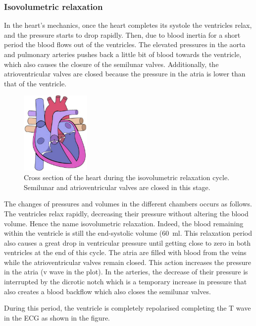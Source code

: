 \subsubsection{Isovolumetric relaxation}
In the heart's mechanics, once the heart completes its systole the ventricles relax, and the pressure starts to drop rapidly. Then, due to blood inertia for a short period the blood flows out of the ventricles. The elevated pressures in the aorta and pulmonary arteries pushes back a little bit of blood towards the ventricle, which also causes the closure of the semilunar valves. Additionally, the atrioventricular valves are closed because the pressure in the atria is lower than that of the ventricle.

\begin{figure}[!htpb]
		\centering
		\includegraphics[height=4cm,keepaspectratio]{figure_9}
		\caption[Heart during isovolumetric relaxation cycle]{Cross section of the heart during the isovolumetric relaxation cycle. Semilunar and atrioventricular valves are closed in this stage.}
		\label{fig:heart isovolumetric relaxation}
\end{figure}

The changes of pressures and volumes in the different chambers occurs as follows. The ventricles relax rapidly, decreasing their pressure without altering the blood volume. Hence the name isovolumetric relaxation. Indeed, the blood remaining within the ventricle is still the end-systolic volume (\SI{60}{\milli\litre}. This relaxation period also causes a great drop in ventricular pressure until getting close to zero in both ventricles at the end of this cycle. The atria are filled with blood from the veins while the atrioventricular valves remain closed. This action increases the pressure in the atria (v wave in the plot). In the arteries, the decrease of their pressure is interrupted by the dicrotic notch which is a temporary increase in pressure that also creates a blood backflow which also closes the semilunar valves. 

During this period, the ventricle is completely repolarised completing the T wave in the ECG as shown in the figure.

